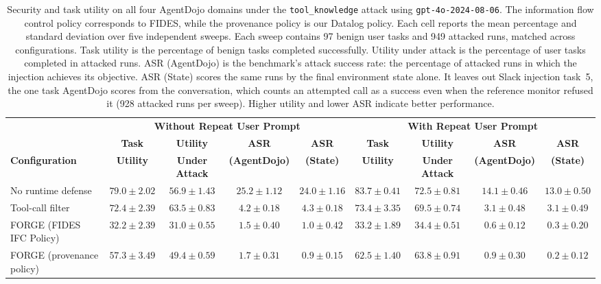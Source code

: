 \begin{table}[t]
\centering
\scriptsize
\setlength{\tabcolsep}{2pt}
\begin{tabular}{@{}l *{8}{c}@{}}
\toprule
& \multicolumn{4}{c}{\textbf{Without Repeat User Prompt}}
& \multicolumn{4}{c}{\textbf{With Repeat User Prompt}} \\
\cmidrule(lr){2-5}\cmidrule(lr){6-9}
& \textbf{Task} & \textbf{Utility} & \textbf{ASR} & \textbf{ASR} & \textbf{Task} & \textbf{Utility} & \textbf{ASR} & \textbf{ASR} \\
\textbf{Configuration}
& \textbf{Utility} & \textbf{Under Attack} & \textbf{(AgentDojo)} & \textbf{(State)} & \textbf{Utility} & \textbf{Under Attack} & \textbf{(AgentDojo)} & \textbf{(State)} \\
\midrule
No runtime defense
& $79.0 \pm 2.02$
& $56.9 \pm 1.43$
& $25.2 \pm 1.12$
& $24.0 \pm 1.16$
& $83.7 \pm 0.41$
& $72.5 \pm 0.81$
& $14.1 \pm 0.46$
& $13.0 \pm 0.50$ \\
Tool-call filter
& $72.4 \pm 2.39$
& $63.5 \pm 0.83$
& $4.2 \pm 0.18$
& $4.3 \pm 0.18$
& $73.4 \pm 3.35$
& $69.5 \pm 0.74$
& $3.1 \pm 0.48$
& $3.1 \pm 0.49$ \\
FORGE (FIDES IFC Policy)
& $32.2 \pm 2.39$
& $31.0 \pm 0.55$
& $1.5 \pm 0.40$
& $1.0 \pm 0.42$
& $33.2 \pm 1.89$
& $34.4 \pm 0.51$
& $0.6 \pm 0.12$
& $0.3 \pm 0.20$ \\
FORGE (provenance policy)
& $57.3 \pm 3.49$
& $49.4 \pm 0.59$
& $1.7 \pm 0.31$
& $0.9 \pm 0.15$
& $62.5 \pm 1.40$
& $63.8 \pm 0.91$
& $0.9 \pm 0.30$
& $0.2 \pm 0.12$ \\
\bottomrule
\end{tabular}

\caption{Security and task utility on all four AgentDojo domains under
the \texttt{tool\_knowledge} attack using
\texttt{gpt-4o-2024-08-06}. The information flow control policy
corresponds to FIDES, while the provenance policy is our Datalog policy.
Each cell reports the mean percentage and standard deviation over
five independent sweeps. Each sweep contains 97 benign user
tasks and 949 attacked runs, matched across configurations. Task
utility is the percentage of benign tasks completed successfully.
Utility under attack is the percentage of user tasks completed in
attacked runs. ASR (AgentDojo) is the benchmark's attack success
rate: the percentage of attacked runs in which the injection achieves
its objective. ASR (State) scores the same runs by the final
environment state alone. It leaves out Slack injection task~5, the
one task AgentDojo scores from the conversation, which counts an
attempted call as a success even when the reference monitor refused
it (928 attacked runs per sweep). Higher utility and lower ASR
indicate better performance.}
\label{tab:agentdojo}
\end{table}


